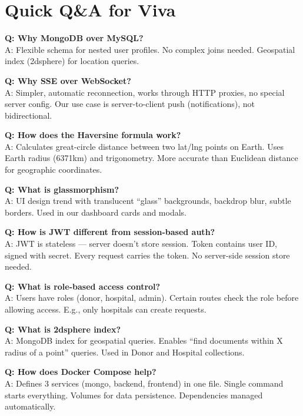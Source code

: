 \documentclass[10pt,a4paper]{article}
\begin{document}
\section{Quick Q\&A for Viva}

\textbf{Q: Why MongoDB over MySQL?}\\
A: Flexible schema for nested user profiles. No complex joins needed. Geospatial index (2dsphere) for location queries.

\textbf{Q: Why SSE over WebSocket?}\\
A: Simpler, automatic reconnection, works through HTTP proxies, no special server config. Our use case is server-to-client push (notifications), not bidirectional.

\textbf{Q: How does the Haversine formula work?}\\
A: Calculates great-circle distance between two lat/lng points on Earth. Uses Earth radius (6371km) and trigonometry. More accurate than Euclidean distance for geographic coordinates.

\textbf{Q: What is glassmorphism?}\\
A: UI design trend with translucent ``glass'' backgrounds, backdrop blur, subtle borders. Used in our dashboard cards and modals.

\textbf{Q: How is JWT different from session-based auth?}\\
A: JWT is stateless --- server doesn't store session. Token contains user ID, signed with secret. Every request carries the token. No server-side session store needed.

\textbf{Q: What is role-based access control?}\\
A: Users have roles (donor, hospital, admin). Certain routes check the role before allowing access. E.g., only hospitals can create requests.

\textbf{Q: What is 2dsphere index?}\\
A: MongoDB index for geospatial queries. Enables ``find documents within X radius of a point'' queries. Used in Donor and Hospital collections.

\textbf{Q: How does Docker Compose help?}\\
A: Defines 3 services (mongo, backend, frontend) in one file. Single command starts everything. Volumes for data persistence. Dependencies managed automatically.
\end{document}
